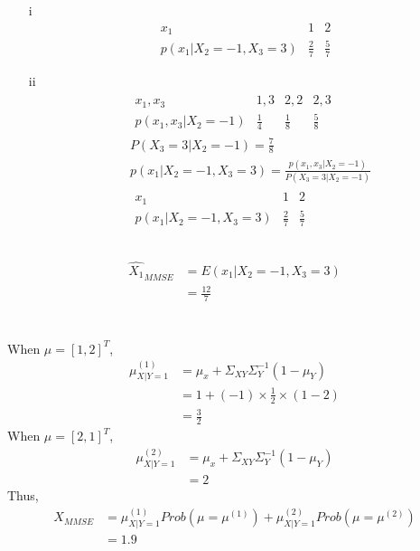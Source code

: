 \documentclass{article}
\begin{document}
\section{}
\subsection{}
\begin{itemize}
    \item [i]
    $$
    \begin{matrix}
        x_1&1&2\\
        p(x_1|X_2=-1,X_3=3)&\frac{2}{7}&\frac{5}{7}
    \end{matrix}
    $$
    \item [ii]
    \begin{align*}
        &
        \begin{matrix}
            x_1,x_3&1,3&2,2&2,3\\
            p(x_1,x_3|X_2=-1)&\frac{1}{4}&\frac{1}{8}&\frac{5}{8}
        \end{matrix}\\
        &P(X_3=3|X_2=-1)=\frac{7}{8}\\
        &p(x_1|X_2=-1,X_3=3)=\frac{p(x_1,x_3|X_2=-1)}{P(X_3=3|X_2=-1)}\\
        &
        \begin{matrix}
            x_1&1&2\\
            p(x_1|X_2=-1,X_3=3)&\frac{2}{7}&\frac{5}{7}
        \end{matrix}
    \end{align*}
\end{itemize}

\subsection{}
\begin{align*}
    \hat{X_1}_{MMSE} &= E(x_1|X_2 = -1,X_3 = 3)\\
    &=\frac{12}{7}
\end{align*}
\section{}
When $\mu = [1,2]^T$,
\begin{align*}
    \mu^{(1)}_{X|Y=1}&=\mu_x+\Sigma_{XY}\Sigma_Y^{-1}(1-\mu_Y)\\
    &=1+(-1)\times\frac{1}{2}\times(1-2)\\
    &=\frac{3}{2}
\end{align*}
When $\mu = [2,1]^T$,
\begin{align*}
    \mu^{(2)}_{X|Y=1}&=\mu_x+\Sigma_{XY}\Sigma_Y^{-1}(1-\mu_Y)\\
    &=2
\end{align*}
Thus,
\begin{align*}
    X_{MMSE}&=\mu^{(1)}_{X|Y=1}Prob(\mu=\mu^{(1)})+\mu^{(2)}_{X|Y=1}Prob(\mu=\mu^{(2)})\\
    &=1.9
\end{align*}
\end{document}

